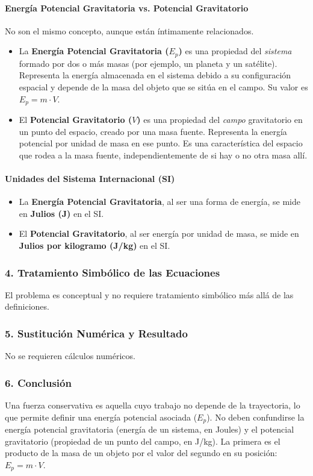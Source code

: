\paragraph*{Energía Potencial Gravitatoria vs. Potencial Gravitatorio}
No son el mismo concepto, aunque están íntimamente relacionados.
\begin{itemize}
    \item La \textbf{Energía Potencial Gravitatoria ($E_p$)} es una propiedad del \textit{sistema} formado por dos o más masas (por ejemplo, un planeta y un satélite). Representa la energía almacenada en el sistema debido a su configuración espacial y depende de la masa del objeto que se sitúa en el campo. Su valor es $E_p = m \cdot V$.
    \item El \textbf{Potencial Gravitatorio ($V$)} es una propiedad del \textit{campo} gravitatorio en un punto del espacio, creado por una masa fuente. Representa la energía potencial por unidad de masa en ese punto. Es una característica del espacio que rodea a la masa fuente, independientemente de si hay o no otra masa allí.
\end{itemize}

\paragraph*{Unidades del Sistema Internacional (SI)}
\begin{itemize}
    \item La \textbf{Energía Potencial Gravitatoria}, al ser una forma de energía, se mide en \textbf{Julios (J)} en el SI.
    \item El \textbf{Potencial Gravitatorio}, al ser energía por unidad de masa, se mide en \textbf{Julios por kilogramo (J/kg)} en el SI.
\end{itemize}

\subsubsection*{4. Tratamiento Simbólico de las Ecuaciones}
El problema es conceptual y no requiere tratamiento simbólico más allá de las definiciones.

\subsubsection*{5. Sustitución Numérica y Resultado}
No se requieren cálculos numéricos.

\subsubsection*{6. Conclusión}
\begin{cajaconclusion}
Una fuerza conservativa es aquella cuyo trabajo no depende de la trayectoria, lo que permite definir una energía potencial asociada ($E_p$). No deben confundirse la energía potencial gravitatoria (energía de un sistema, en Joules) y el potencial gravitatorio (propiedad de un punto del campo, en J/kg). La primera es el producto de la masa de un objeto por el valor del segundo en su posición: $E_p = m \cdot V$.
\end{cajaconclusion}

